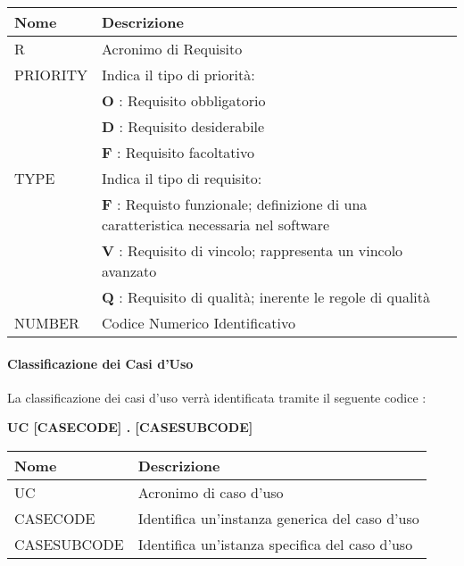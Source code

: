 \renewcommand{\arraystretch}{1.8} %
\begin{tabular}{ |m{7em}|m{30em}| }
  \hline
  \textbf{Nome} & \textbf{Descrizione} \\
  \hline
  R & Acronimo di Requisito \\
  \hline
  PRIORITY & Indica il tipo di priorità: \\
        &	\textbf{O} : Requisito obbligatorio \\
        &	\textbf{D} : Requisito desiderabile \\
        &	\textbf{F} : Requisito facoltativo  \\
  \hline 	 
  TYPE & Indica il tipo di requisito: \\
        & \textbf{F} : Requisto funzionale; definizione di una 	caratteristica necessaria nel software \\
        &	\textbf{V} : Requisito di vincolo; rappresenta un vincolo avanzato \\
        &	\textbf{Q} : Requisito di qualità; inerente le regole di qualità \\
  \hline
  NUMBER & Codice Numerico Identificativo \\
  \hline
\end{tabular}
  
\paragraph{Classificazione dei Casi d'Uso} \hfill \break
La classificazione dei casi d'uso verrà identificata tramite il seguente codice : 
\begin{center}
  \textbf{UC [CASECODE] . [CASESUBCODE]}
\end{center}
  
\begin{tabular}{ |m{10em}|m{27em}| }
  \hline
  \textbf{Nome} & \textbf{Descrizione} \\
  \hline
  UC & Acronimo di caso d'uso \\
  \hline
  CASECODE & Identifica un'instanza generica del caso d'uso  \\
  \hline
  CASESUBCODE & Identifica un'istanza specifica del caso d'uso \\
  \hline
\end{tabular}
  
